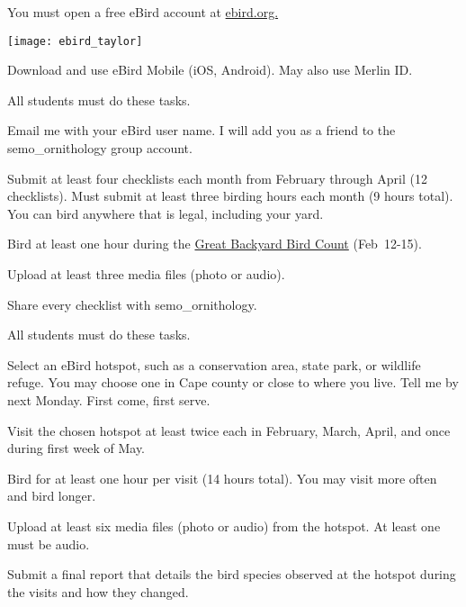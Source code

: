 \documentclass[t]{beamer}
\begin{document}
{
\begin{frame}{You must open a free eBird account at \href{https://ebird.org}{ebird.org.}}
	\vspace{-\baselineskip}
	\begin{center}
		\texttt{[image: ebird\_taylor]}
	\end{center}
	
	Download and use eBird Mobile (iOS, Android). May also use Merlin ID.
%	
\end{frame}
}

{
\begin{frame}{All students must do these tasks.}

\vspace{-\baselineskip}

\hangpara Email me with your eBird user name. I will add you as a friend to the semo\_ornithology group account.

\hangpara Submit at least four checklists each month from February through April (12 checklists). Must submit at least three birding hours each month (9 hours total). You can bird anywhere that is legal, including your yard.

\hangpara Bird at least one hour during the \href{https://www.birdcount.org/}{Great Backyard Bird Count} (Feb~12-15).

\hangpara Upload at least three media files (photo or audio).

\hangpara Share every checklist with semo\_ornithology.

\hangpara \href{https://support.ebird.org/en/support/solutions/articles/48000795623-ebird-rules-and-best-practices}{}

\end{frame}
}

{
\begin{frame}{All  students must do these tasks.}

\vspace{-\baselineskip}

\hangpara Select an eBird hotspot, such as a conservation area, state park, or wildlife refuge. You may choose one in Cape county or close to where you live. Tell me by next Monday. First come, first serve.

\hangpara Visit the chosen hotspot at least twice each in February, March, April, and once during first week of May.

\hangpara Bird for at least one hour per visit (14 hours total). You may visit more often and bird longer. 


\hangpara Upload at least six media files (photo or audio) from the hotspot. At least one must be audio.

\hangpara Submit a final report that details the bird species observed at the hotspot during the visits and how they changed. 

\end{frame}
}
\end{document}
